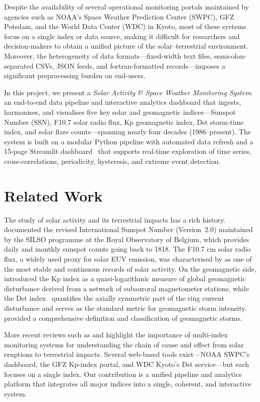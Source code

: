 Despite the availability of several operational monitoring portals maintained by agencies such as NOAA's Space Weather Prediction Center (SWPC), GFZ Potsdam, and the World Data Center (WDC) in Kyoto, most of these systems focus on a single index or data source, making it difficult for researchers and decision-makers to obtain a unified picture of the solar--terrestrial environment. Moreover, the heterogeneity of data formats---fixed-width text files, semicolon-separated CSVs, JSON feeds, and fortran-formatted records---imposes a significant preprocessing burden on end-users.

In this project, we present a \emph{Solar Activity \& Space Weather Monitoring System}: an end-to-end data pipeline and interactive analytics dashboard that ingests, harmonises, and visualises five key solar and geomagnetic indices---Sunspot Number (SSN), F10.7 solar radio flux, Kp geomagnetic index, Dst storm-time index, and solar flare counts---spanning nearly four decades (1986--present). The system is built on a modular Python pipeline with automated data refresh and a 15-page Streamlit dashboard~\citep{streamlit_2020} that supports real-time exploration of time series, cross-correlations, periodicity, hysteresis, and extreme event detection.


\section{Related Work}

The study of solar activity and its terrestrial impacts has a rich history. \citet{clette_sunspot_2014} documented the revised International Sunspot Number (Version~2.0) maintained by the SILSO programme at the Royal Observatory of Belgium, which provides daily and monthly sunspot counts going back to 1818. The F10.7 cm solar radio flux, a widely used proxy for solar EUV emission, was characterised by \citet{tapping_f107_2013} as one of the most stable and continuous records of solar activity. On the geomagnetic side, \citet{bartels_kp_1939} introduced the Kp index as a quasi-logarithmic measure of global geomagnetic disturbance derived from a network of subauroral magnetometer stations, while the Dst index~\citep{sugiura_dst_1964} quantifies the axially symmetric part of the ring current disturbance and serves as the standard metric for geomagnetic storm intensity. \citet{gonzalez_storms_1994} provided a comprehensive definition and classification of geomagnetic storms.

More recent reviews such as \citet{temmer_space_2021} and \citet{hathaway_solar_2015} highlight the importance of multi-index monitoring systems for understanding the chain of cause and effect from solar eruptions to terrestrial impacts. Several web-based tools exist---NOAA SWPC's dashboard, the GFZ Kp-index portal, and WDC Kyoto's Dst service---but each focuses on a single index. Our contribution is a unified pipeline and analytics platform that integrates all major indices into a single, coherent, and interactive system.


